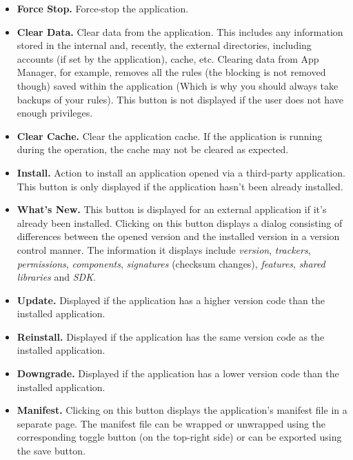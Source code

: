 \begin{itemize}
    \item \textbf{Force Stop.} Force-stop the application.

    \item \textbf{Clear Data.} Clear data from the application. This includes any information stored in the internal
    and, recently, the external directories, including accounts (if set by the application), cache, etc. Clearing data
    from App Manager, for example, removes all the rules (the blocking is not removed though) saved within the
    application (Which is why you should always take backups of your rules). This button is not displayed if the user
    does not have enough privileges.

    \item \textbf{Clear Cache.} Clear the application cache. If the application is running during the operation, the
    cache may not be cleared as expected.

    \item \textbf{Install.} Action to install an application opened via a third-party application. This button is only
    displayed if the application hasn't been already installed.

    \item \textbf{What's New.} This button is displayed for an external application if it's already been installed.
    Clicking on this button displays a dialog consisting of differences between the opened version and the installed
    version in a version control manner. The information it displays include \textit{version}, \textit{trackers},
    \textit{permissions}, \textit{components}, \textit{signatures} (checksum changes), \textit{features},
    \textit{shared libraries} and \textit{SDK}.

    \item \textbf{Update.} Displayed if the application has a higher version code than the installed application.

    \item \textbf{Reinstall.} Displayed if the application has the same version code as the installed application.

    \item \textbf{Downgrade.} Displayed if the application has a lower version code than the installed application.

    \item \textbf{Manifest.} Clicking on this button displays the application's manifest file in a separate page. The
    manifest file can be wrapped or unwrapped using the corresponding toggle button (on the top-right side) or can be
    exported using the save button.


\end{itemize}
